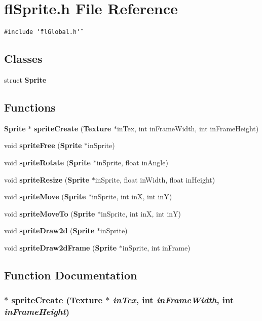 \section{fl\-Sprite.h File Reference}
\label{flSprite_8h}
{\tt \#include \char`\"{}fl\-Global.h\char`\"{}}\par
\subsection*{Classes}
\begin{CompactItemize}
\item 
struct {\bf Sprite}
\end{CompactItemize}
\subsection*{Functions}
\begin{CompactItemize}
\item 
{\bf Sprite} $\ast$ {\bf sprite\-Create} ({\bf Texture} $\ast$in\-Tex, int in\-Frame\-Width, int in\-Frame\-Height)
\item 
void {\bf sprite\-Free} ({\bf Sprite} $\ast$in\-Sprite)
\item 
void {\bf sprite\-Rotate} ({\bf Sprite} $\ast$in\-Sprite, float in\-Angle)
\item 
void {\bf sprite\-Resize} ({\bf Sprite} $\ast$in\-Sprite, float in\-Width, float in\-Height)
\item 
void {\bf sprite\-Move} ({\bf Sprite} $\ast$in\-Sprite, int in\-X, int in\-Y)
\item 
void {\bf sprite\-Move\-To} ({\bf Sprite} $\ast$in\-Sprite, int in\-X, int in\-Y)
\item 
void {\bf sprite\-Draw2d} ({\bf Sprite} $\ast$in\-Sprite)
\item 
void {\bf sprite\-Draw2d\-Frame} ({\bf Sprite} $\ast$in\-Sprite, int in\-Frame)
\end{CompactItemize}


\subsection{Function Documentation}
\subsubsection{$\ast$ sprite\-Create ({\bf Texture} $\ast$ {\em in\-Tex}, int {\em in\-Frame\-Width}, int {\em in\-Frame\-Height})}\label{flSprite_8h_75ec4b4209f048cbad04c4f882851961}




